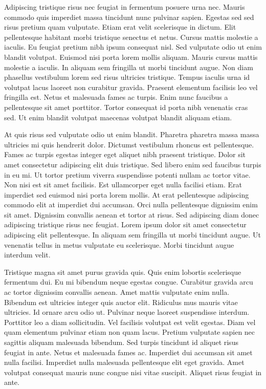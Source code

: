 \documentclass[11pt,a4paper]{article}
\begin{document}
Adipiscing tristique risus nec feugiat in fermentum posuere urna nec. Mauris commodo quis imperdiet massa tincidunt nunc pulvinar sapien. Egestas sed sed risus pretium quam vulputate. Etiam erat velit scelerisque in dictum. Elit pellentesque habitant morbi tristique senectus et netus. Cursus mattis molestie a iaculis. Eu feugiat pretium nibh ipsum consequat nisl. Sed vulputate odio ut enim blandit volutpat. Euismod nisi porta lorem mollis aliquam. Mauris cursus mattis molestie a iaculis. In aliquam sem fringilla ut morbi tincidunt augue. Non diam phasellus vestibulum lorem sed risus ultricies tristique. Tempus iaculis urna id volutpat lacus laoreet non curabitur gravida. Praesent elementum facilisis leo vel fringilla est. Netus et malesuada fames ac turpis. Enim nunc faucibus a pellentesque sit amet porttitor. Tortor consequat id porta nibh venenatis cras sed. Ut enim blandit volutpat maecenas volutpat blandit aliquam etiam.

At quis risus sed vulputate odio ut enim blandit. Pharetra pharetra massa massa ultricies mi quis hendrerit dolor. Dictumst vestibulum rhoncus est pellentesque. Fames ac turpis egestas integer eget aliquet nibh praesent tristique. Dolor sit amet consectetur adipiscing elit duis tristique. Sed libero enim sed faucibus turpis in eu mi. Ut tortor pretium viverra suspendisse potenti nullam ac tortor vitae. Non nisi est sit amet facilisis. Est ullamcorper eget nulla facilisi etiam. Erat imperdiet sed euismod nisi porta lorem mollis. At erat pellentesque adipiscing commodo elit at imperdiet dui accumsan. Orci nulla pellentesque dignissim enim sit amet. Dignissim convallis aenean et tortor at risus. Sed adipiscing diam donec adipiscing tristique risus nec feugiat. Lorem ipsum dolor sit amet consectetur adipiscing elit pellentesque. In aliquam sem fringilla ut morbi tincidunt augue. Ut venenatis tellus in metus vulputate eu scelerisque. Morbi tincidunt augue interdum velit.

Tristique magna sit amet purus gravida quis. Quis enim lobortis scelerisque fermentum dui. Eu mi bibendum neque egestas congue. Curabitur gravida arcu ac tortor dignissim convallis aenean. Amet mattis vulputate enim nulla. Bibendum est ultricies integer quis auctor elit. Ridiculus mus mauris vitae ultricies. Id ornare arcu odio ut. Pulvinar neque laoreet suspendisse interdum. Porttitor leo a diam sollicitudin. Vel facilisis volutpat est velit egestas. Diam vel quam elementum pulvinar etiam non quam lacus. Pretium vulputate sapien nec sagittis aliquam malesuada bibendum. Sed turpis tincidunt id aliquet risus feugiat in ante. Netus et malesuada fames ac. Imperdiet dui accumsan sit amet nulla facilisi. Imperdiet nulla malesuada pellentesque elit eget gravida. Amet volutpat consequat mauris nunc congue nisi vitae suscipit. Aliquet risus feugiat in ante.
\end{document}
